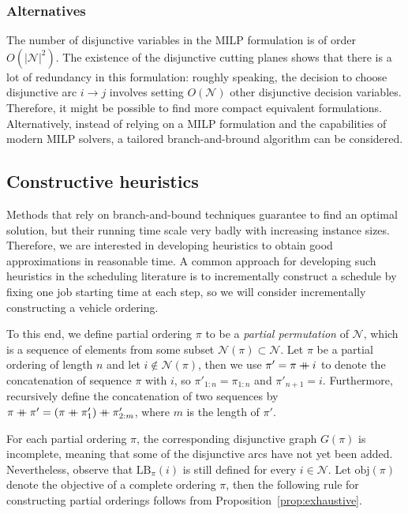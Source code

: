 \documentclass[a4paper]{article}
\newcommand\mdoubleplus{\mathbin{+\mkern-10mu+}}
\theoremstyle{definition}
\theoremstyle{plain}
\begin{document}
\subsubsection*{Alternatives}
The number of disjunctive variables in the MILP formulation is of order $O(|\mathcal{N}|^{2})$.
%
The existence of the disjunctive cutting planes shows that there is a lot of redundancy in this formulation: roughly speaking, the decision to choose disjunctive arc $i \rightarrow j$ involves setting $O(\mathcal{N})$ other disjunctive decision variables.
%
Therefore, it might be possible to find more compact equivalent formulations.
%
Alternatively, instead of relying on a MILP formulation and the capabilities of
modern MILP solvers, a tailored branch-and-bround algorithm can be considered.



\subsection*{Constructive heuristics}

Methods that rely on branch-and-bound techniques guarantee to find an optimal
solution, but their running time scale very badly with increasing instance
sizes. Therefore, we are interested in developing heuristics to obtain good
approximations in reasonable time. A common approach for developing such
heuristics in the scheduling literature is to incrementally construct a schedule
by fixing one job starting time at each step, so we will consider incrementally
constructing a vehicle ordering.

To this end, we define partial ordering $\pi$ to be a \textit{partial permutation} of
$\mathcal{N}$, which is a sequence of elements from some subset
$\mathcal{N}(\pi) \subset \mathcal{N}$.
%
Let $\pi$ be a partial ordering of length $n$ and let
$i \notin \mathcal{N}(\pi)$, then we use $\pi' = \pi \mdoubleplus i$ to denote
the concatenation of sequence $\pi$ with $i$, so $\pi'_{1:n} = \pi_{1:n}$ and
$\pi'_{n+1} = i$. Furthermore, recursively define the concatenation of two
sequences by
$\pi \mdoubleplus \pi' = ( \pi \mdoubleplus \pi'_{1} ) \mdoubleplus \pi'_{2:m}$,
where $m$ is the length of $\pi'$.

For each partial ordering $\pi$, the corresponding disjunctive graph $G(\pi)$ is
incomplete, meaning that some of the disjunctive arcs have not yet been added.
Nevertheless, observe that $\text{LB}_{\pi}(i)$ is still defined for every
$i \in \mathcal{N}$.
%
Let $\text{obj}(\pi)$ denote the objective of a complete ordering $\pi$, then
the following rule for constructing partial orderings follows from
Proposition~\ref{prop:exhaustive}.
\end{document}
